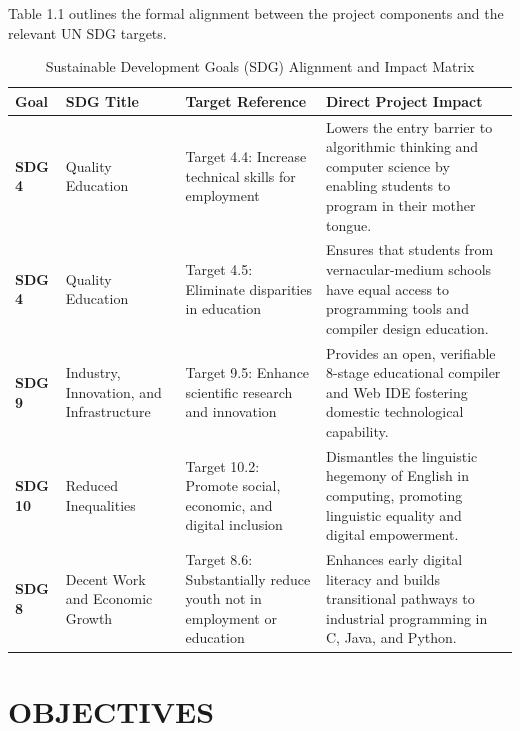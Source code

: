 \documentclass[12pt,a4paper]{report}
\begin{document}
Table 1.1 outlines the formal alignment between the project components and the relevant UN SDG targets.

\begin{table}[htbp]
    \centering
    \caption{Sustainable Development Goals (SDG) Alignment and Impact Matrix}
    \label{tab:sdg_mapping}
    \vspace{0.2cm}
    \begin{tabularx}{\textwidth}{llp{4.2cm}X}
        \toprule
        \textbf{Goal} & \textbf{SDG Title} & \textbf{Target Reference} & \textbf{Direct Project Impact} \\
        \midrule
        \textbf{SDG 4} & Quality Education & Target 4.4: Increase technical skills for employment & Lowers the entry barrier to algorithmic thinking and computer science by enabling students to program in their mother tongue. \\
        \addlinespace
        \textbf{SDG 4} & Quality Education & Target 4.5: Eliminate disparities in education & Ensures that students from vernacular-medium schools have equal access to programming tools and compiler design education. \\
        \addlinespace
        \textbf{SDG 9} & Industry, Innovation, and Infrastructure & Target 9.5: Enhance scientific research and innovation & Provides an open, verifiable 8-stage educational compiler and Web IDE fostering domestic technological capability. \\
        \addlinespace
        \textbf{SDG 10} & Reduced Inequalities & Target 10.2: Promote social, economic, and digital inclusion & Dismantles the linguistic hegemony of English in computing, promoting linguistic equality and digital empowerment. \\
        \addlinespace
        \textbf{SDG 8} & Decent Work and Economic Growth & Target 8.6: Substantially reduce youth not in employment or education & Enhances early digital literacy and builds transitional pathways to industrial programming in C, Java, and Python. \\
        \bottomrule
    \end{tabularx}
\end{table}

\newpage
\chapter{OBJECTIVES}
\end{document}
